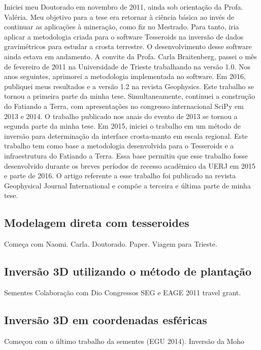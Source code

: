 Iniciei meu Doutorado em novembro de 2011, ainda sob orientação da Profa.
Valéria. Meu objetivo para a tese era retornar à ciência básica ao invés de
continuar as aplicações à mineração, como fiz no Mestrado. Para tanto, iria
aplicar a metodologia criada para o software Tesseroids na inversão de dados
gravimétricos para estudar a crosta terrestre. O desenvolvimento desse software
ainda estava em andamento. A convite da Profa. Carla Braitenberg, passei o mês
de fevereiro de 2011 na Universidade de Trieste trabalhando na versão 1.0. Nos
anos seguintes, aprimorei a metodologia implementada no software. Em 2016,
publiquei meus resultados e a versão 1.2 na revista Geophysics. Este trabalho
se tornou a primeira parte da minha tese. Simultaneamente, continuei a
construção do Fatiando a Terra, com apresentações no congresso internacional
SciPy em 2013 e 2014. O trabalho publicado nos anais do evento de 2013 se
tornou a segunda parte da minha tese. Em 2015, iniciei o trabalho em um método
de inversão para determinação da interface crosta-manto em escala regional.
Este trabalho tem como base a metodologia desenvolvida para o Tesseroids e a
infraestrutura do Fatiando a Terra. Essa base permitiu que esse trabalho fosse
desenvolvido durante os breves períodos de recesso acadêmico da UERJ em 2015 e
parte de 2016. O artigo referente a esse trabalho foi publicado na revista
Geophysical Journal International e compõe a terceira e última parte de minha
tese.



\subsection{Modelagem direta com tesseroides}

Começa com Naomi. Carla. Doutorado.
Paper.
Viagem para Trieste.

\subsection{Inversão 3D utilizando o método de plantação}

Sementes
Colaboração com Dio
Congressos
SEG e EAGE 2011 travel grant.


\subsection{Inversão 3D em coordenadas esféricas}


Começou com o último trabalho da sementes (EGU 2014).
Inversão da Moho


